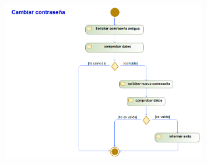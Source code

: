 \begin{figure}[H]
    \centering
    \includegraphics[width=0.8\textwidth]{Use_Cases/cambiar_contrasena.png}
\end{figure}
\newpage
